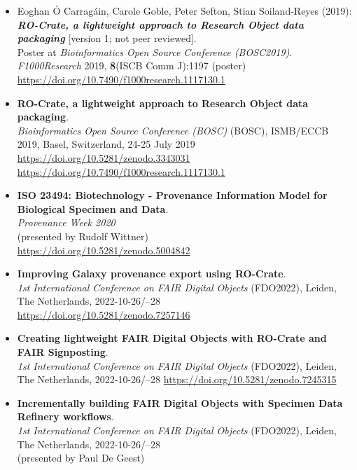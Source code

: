 \begin{itemize}
  \item
    Eoghan Ó Carragáin, Carole Goble, Peter Sefton, Stian Soiland-Reyes
    (2019):\\
    \textbf{\emph{RO-Crate, a lightweight approach to Research Object data
    packaging}} {[}version 1; not peer reviewed{]}.\\
    Poster at \emph{Bioinformatics Open Source Conference (BOSC2019)}.
    \emph{F1000Research} 2019, \textbf{8}(ISCB Comm J):1197 (poster)\\
    \url{https://doi.org/10.7490/f1000research.1117130.1}
  \item
    \textbf{RO-Crate, a lightweight approach to Research Object data
    packaging}.\\
    \emph{Bioinformatics Open Source Conference (BOSC)} (BOSC), ISMB/ECCB
    2019, Basel, Switzerland, 24-25 July 2019\\
    \url{https://doi.org/10.5281/zenodo.3343031}~\\
    \url{https://doi.org/10.7490/f1000research.1117130.1}
  \item
    \textbf{ISO 23494: Biotechnology - Provenance Information Model for
    Biological Specimen and Data}.\\
    \emph{Provenance Week 2020}\\
    (presented by Rudolf Wittner)\\
    \url{https://doi.org/10.5281/zenodo.5004842}
  \item
    \textbf{Improving Galaxy provenance export using RO-Crate}.\\
    \emph{1st International Conference on FAIR Digital Objects} (FDO2022),
    Leiden, The Netherlands, 2022-10-26/--28\\
    \url{https://doi.org/10.5281/zenodo.7257146}
  \item
    \textbf{Creating lightweight FAIR Digital Objects with RO-Crate and
    FAIR Signposting}.\\
    \emph{1st International Conference on FAIR Digital Objects} (FDO2022),
    Leiden, The Netherlands, 2022-10-26/--28
    \url{https://doi.org/10.5281/zenodo.7245315}
  \item
    \textbf{Incrementally building FAIR Digital Objects with Specimen Data
    Refinery workflows}.\\
    \emph{1st International Conference on FAIR Digital Objects} (FDO2022),
    Leiden, The Netherlands, 2022-10-26/--28\\
    (presented by Paul De Geest)\\

\end{itemize}
